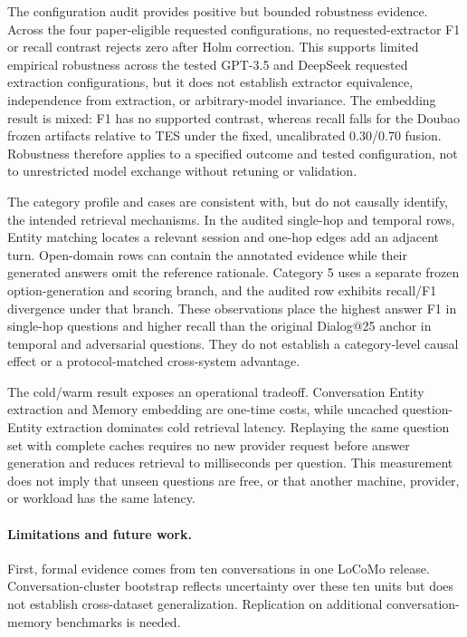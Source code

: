 \documentclass[10pt,twocolumn]{article}
\begin{document}
The configuration audit provides positive but bounded robustness evidence.
Across the four paper-eligible requested configurations, no requested-extractor
F1 or recall contrast rejects zero after Holm correction. This supports
limited empirical robustness across the tested GPT-3.5 and DeepSeek requested
extraction configurations, but it does not establish extractor equivalence,
independence from extraction, or arbitrary-model invariance. The embedding
result is mixed: F1 has no supported contrast, whereas recall falls for the
Doubao frozen artifacts relative to TES under the fixed, uncalibrated
0.30/0.70 fusion. Robustness therefore
applies to a specified outcome and tested configuration, not to unrestricted
model exchange without retuning or validation.

The category profile and cases are consistent with, but do not causally
identify, the intended retrieval mechanisms. In the audited single-hop and
temporal rows, Entity matching locates a relevant session and one-hop edges
add an adjacent turn. Open-domain rows can contain the annotated evidence
while their generated answers omit the reference rationale. Category 5 uses a
separate frozen option-generation and scoring branch, and the audited row
exhibits recall/F1 divergence under that branch. These observations place the
highest answer F1 in single-hop questions and higher recall than the original
Dialog@25 anchor in temporal and adversarial questions. They do not establish
a category-level causal effect or a protocol-matched cross-system advantage.

The cold/warm result exposes an operational tradeoff. Conversation Entity
extraction and Memory embedding are one-time costs, while uncached
question-Entity extraction dominates cold retrieval latency. Replaying the
same question set with complete caches requires no new provider request before
answer generation and reduces retrieval to milliseconds per question. This
measurement does not imply that unseen questions are free, or that another
machine, provider, or workload has the same latency.

\paragraph{Limitations and future work.}

First, formal evidence comes from ten conversations in one LoCoMo release.
Conversation-cluster bootstrap reflects uncertainty over these ten units but
does not establish cross-dataset generalization. Replication on additional
conversation-memory benchmarks is needed.
\end{document}
